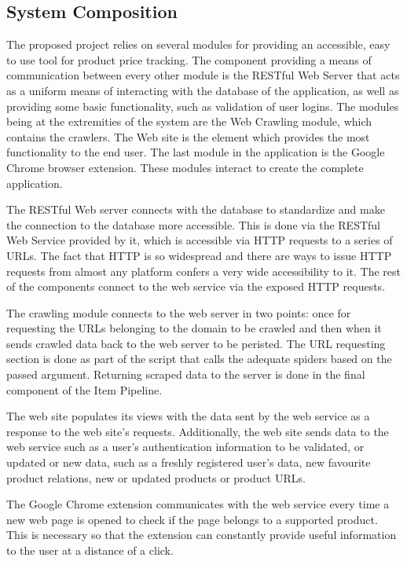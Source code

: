 \documentclass[12pt,a4paper,twoside]{report}
\begin{document}
\subsection{System Composition}

The proposed project relies on several modules for providing an accessible, easy to use tool for product price tracking. The component providing a means of communication between every other module is the RESTful Web Server that acts as a uniform means of interacting with the database of the application, as well as providing some basic functionality, such as validation of user logins. The modules being at the extremities of the system are the Web Crawling module, which contains the crawlers. The Web site is the element which provides the most functionality to the end user. The last module in the application is the Google Chrome browser extension. These modules interact to create the complete application.

The RESTful Web server connects with the database to standardize and make the connection to the database more accessible. This is done via the RESTful Web Service provided by it, which is accessible via HTTP requests to a series of URLs. The fact that HTTP is so widespread and there are ways to issue HTTP requests from almost any platform confers a very wide accessibility to it. The rest of the components connect to the web service via the exposed HTTP requests.

The crawling module connects to the web server in two points: once for requesting the URLs belonging to the domain to be crawled and then when it sends crawled data back to the web server to be peristed. The URL requesting section is done as part of the script that calls the adequate spiders based on the passed argument. Returning scraped data to the server is done in the final component of the Item Pipeline.

The web site populates its views with the data sent by the web service as a response to the web site's requests. Additionally, the web site sends data to the web service such as a user's authentication information to be validated, or updated or new data, such as a freshly registered user's data, new favourite product relations, new or updated products or product URLs.

The Google Chrome extension communicates with the web service every time a new web page is opened to check if the page belongs to a supported product. This is necessary so that the extension can constantly provide useful information to the user at a distance of a click.
\end{document}
